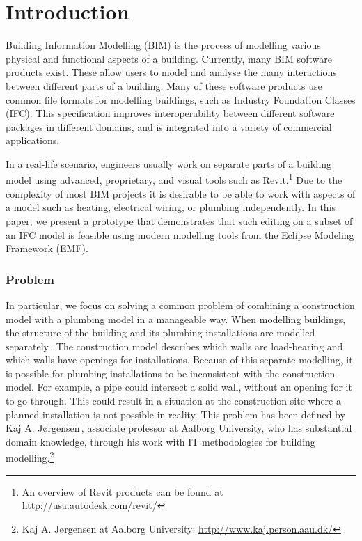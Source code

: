 

\setcounter{page}{1}
\section{Introduction}
Building Information Modelling (BIM) is the process of modelling various physical and functional aspects of a building. Currently, many BIM software products exist. These allow users to model and analyse the many interactions between different parts of a building. Many of these software products use common file formats for modelling buildings, such as Industry Foundation Classes (IFC). This specification improves interoperability between different software packages in different domains, and is integrated into a variety of commercial applications.

In a real-life scenario, engineers usually work on separate parts of a building model using advanced, proprietary, and visual tools such as Revit.\footnote{An overview of Revit products can be found at \url{http://usa.autodesk.com/revit/}} Due to the complexity of most BIM projects it is desirable to be able to work with aspects of a model such as heating, electrical wiring, or plumbing independently. In this paper, we present a prototype that demonstrates that such editing on a subset of an IFC model is feasible using modern modelling tools from the Eclipse Modeling Framework (EMF).

\subsubsection{Problem}
In particular, we focus on solving a common problem of combining a construction model with a plumbing model in a manageable way. When modelling buildings, the structure of the building and its plumbing installations are modelled separately\,\cite[pp. 19--20]{jorgensen10}. The construction model describes which walls are load-bearing and which walls have openings for installations. Because of this separate modelling, it is possible for plumbing installations to be inconsistent with the construction model. For example, a pipe could intersect a solid wall, without an opening for it to go through. This could result in a situation at the construction site where a planned installation is not possible in reality. This problem has been defined by Kaj A. Jørgensen\,\cite{jorgensen10}, associate professor at Aalborg University, who has substantial domain knowledge, through his work with IT methodologies for building modelling.\footnote{Kaj A. Jørgensen at Aalborg University: \url{http://www.kaj.person.aau.dk/}}

